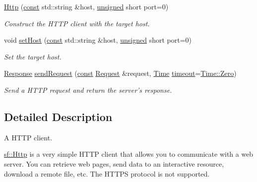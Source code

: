 \begin{DoxyCompactItemize}
\hyperlink{classsf_1_1_http_a79efd844a735f083fcce0edbf1092385}{Http} (\hyperlink{term__entry_8h_a57bd63ce7f9a353488880e3de6692d5a}{const} std\-::string \&host, \hyperlink{curses_8priv_8h_aca40206900cfc164654362fa8d4ad1e6}{unsigned} short port=0)
\begin{DoxyCompactList}\small\item\em Construct the H\-T\-T\-P client with the target host. \end{DoxyCompactList}\item 
void \hyperlink{classsf_1_1_http_a55121d543b61c41cf20b885a97b04e65}{set\-Host} (\hyperlink{term__entry_8h_a57bd63ce7f9a353488880e3de6692d5a}{const} std\-::string \&host, \hyperlink{curses_8priv_8h_aca40206900cfc164654362fa8d4ad1e6}{unsigned} short port=0)
\begin{DoxyCompactList}\small\item\em Set the target host. \end{DoxyCompactList}\item 
\hyperlink{classsf_1_1_http_1_1_response}{Response} \hyperlink{classsf_1_1_http_aaf09ebfb5e00dcc82e0d494d5c6a9e2a}{send\-Request} (\hyperlink{term__entry_8h_a57bd63ce7f9a353488880e3de6692d5a}{const} \hyperlink{classsf_1_1_http_1_1_request}{Request} \&request, \hyperlink{classsf_1_1_time}{Time} \hyperlink{_ndk_8cpp_a174cf046f3b5dbb1258515b3f138b8c7}{timeout}=\hyperlink{classsf_1_1_time_aa343e67f43a940e7b3b51aa10a495f2f}{Time\-::\-Zero})
\begin{DoxyCompactList}\small\item\em Send a H\-T\-T\-P request and return the server's response. \end{DoxyCompactList}\end{DoxyCompactItemize}


\subsection{Detailed Description}
A H\-T\-T\-P client. 

\hyperlink{classsf_1_1_http}{sf\-::\-Http} is a very simple H\-T\-T\-P client that allows you to communicate with a web server. You can retrieve web pages, send data to an interactive resource, download a remote file, etc. The H\-T\-T\-P\-S protocol is not supported.

